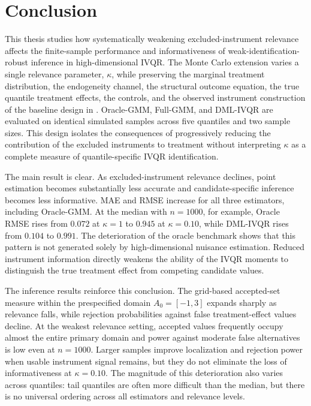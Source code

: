 \section{Conclusion}

This thesis studies how systematically weakening excluded-instrument relevance affects the finite-sample performance and informativeness of weak-identification-robust inference in high-dimensional IVQR. The Monte Carlo extension varies a single relevance parameter, $\kappa$, while preserving the marginal treatment distribution, the endogeneity channel, the structural outcome equation, the true quantile treatment effects, the controls, and the observed instrument construction of the baseline design in \textcite{chen_huang_tien_2021}. Oracle-GMM, Full-GMM, and DML-IVQR are evaluated on identical simulated samples across five quantiles and two sample sizes. This design isolates the consequences of progressively reducing the contribution of the excluded instruments to treatment without interpreting $\kappa$ as a complete measure of quantile-specific IVQR identification.

The main result is clear. As excluded-instrument relevance declines, point estimation becomes substantially less accurate and candidate-specific inference becomes less informative. MAE and RMSE increase for all three estimators, including Oracle-GMM. At the median with $n=1000$, for example, Oracle RMSE rises from $0.072$ at $\kappa=1$ to $0.945$ at $\kappa=0.10$, while DML-IVQR rises from $0.104$ to $0.991$. The deterioration of the oracle benchmark shows that this pattern is not generated solely by high-dimensional nuisance estimation. Reduced instrument information directly weakens the ability of the IVQR moments to distinguish the true treatment effect from competing candidate values.

The inference results reinforce this conclusion. The grid-based accepted-set measure within the prespecified domain $A_0=[-1,3]$ expands sharply as relevance falls, while rejection probabilities against false treatment-effect values decline. At the weakest relevance setting, accepted values frequently occupy almost the entire primary domain and power against moderate false alternatives is low even at $n=1000$. Larger samples improve localization and rejection power when usable instrument signal remains, but they do not eliminate the loss of informativeness at $\kappa=0.10$. The magnitude of this deterioration also varies across quantiles: tail quantiles are often more difficult than the median, but there is no universal ordering across all estimators and relevance levels.

